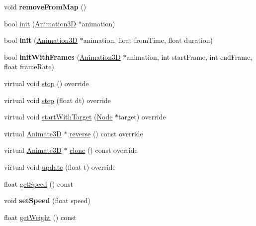 \begin{DoxyCompactItemize}
\item 
\mbox{\label{classAnimate3D_a044297fc83835844b19474d4179a24b1}} 
void {\bfseries remove\+From\+Map} ()
\item 
bool \hyperlink{classAnimate3D_a08ca260aabb4f6569dd1ced348309aaf}{init} (\hyperlink{classAnimation3D}{Animation3D} $\ast$animation)
\item 
\mbox{\label{classAnimate3D_a300abdd17ec48a6609147664a33b5208}} 
bool {\bfseries init} (\hyperlink{classAnimation3D}{Animation3D} $\ast$animation, float from\+Time, float duration)
\item 
\mbox{\label{classAnimate3D_af2c95c3e14ca8a176b34883e7e76e056}} 
bool {\bfseries init\+With\+Frames} (\hyperlink{classAnimation3D}{Animation3D} $\ast$animation, int start\+Frame, int end\+Frame, float frame\+Rate)
\item 
virtual void \hyperlink{classAnimate3D_af37f00e045b7dc5cd1a0c54a4f4f8042}{stop} () override
\item 
virtual void \hyperlink{classAnimate3D_a9fed05e5478085f002769b6931a123d4}{step} (float dt) override
\item 
virtual void \hyperlink{classAnimate3D_a684fa4c9666a80e949c45356e1c1961f}{start\+With\+Target} (\hyperlink{classNode}{Node} $\ast$target) override
\item 
virtual \hyperlink{classAnimate3D}{Animate3D} $\ast$ \hyperlink{classAnimate3D_a54f554bc2790e7c405716c291e00daf7}{reverse} () const override
\item 
virtual \hyperlink{classAnimate3D}{Animate3D} $\ast$ \hyperlink{classAnimate3D_a1de37c3ea3435bc8961d6e5d6d3ac50d}{clone} () const override
\item 
virtual void \hyperlink{classAnimate3D_ae71b012a3b1dd55d12a50148755a5f68}{update} (float t) override
\item 
float \hyperlink{classAnimate3D_a22cd253f8b3caf2d96e68c5ff7f833b4}{get\+Speed} () const
\item 
\mbox{\label{classAnimate3D_ad731fd7945fe60d58052e6d5aa14a675}} 
void {\bfseries set\+Speed} (float speed)
\item 
float \hyperlink{classAnimate3D_ac221fedd9e89cf60aa2a9ba6b7fabea8}{get\+Weight} () const
\item 
\mbox{\label{classAnimate3D_ac84a327ea6852e0b6ba757ec1cdaaa50}} 

\end{DoxyCompactItemize}

